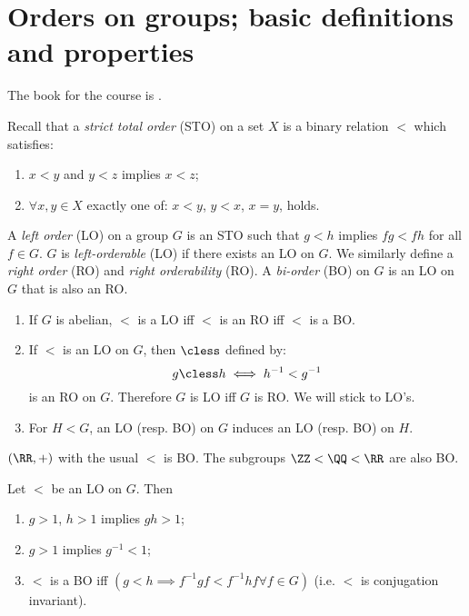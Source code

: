 \chapter{Orders on groups; basic definitions and properties}

The book for the course is \cite{book}.

Recall that a \emph{strict total order} (STO) on a set $X$ is a binary relation $<$
which satisfies:
\begin{enumerate}
\item $x < y$ and $y < z$ implies $x< z$;
\item $\forall x , y\in X$ exactly one of:
$x < y$, $y  <x$, $x = y$, holds.
\end{enumerate}

A \emph{left order} (LO) on a group $G$
is an STO such that $g < h$ implies $fg < fh$ for all $f\in G$.
$G$ is \emph{left-orderable} (LO) if there exists an LO on $G$. 
We similarly define a \emph{right order} (RO) 
and \emph{right orderability} (RO). 
A \emph{bi-order} (BO) on $G$ is an LO on $G$ that is also an RO.

\begin{rmk}
\begin{enumerate}
\item If $G$ is abelian, $<$ is a LO iff $<$ is an RO iff $<$ is a BO.
\item If $<$ is an LO on $G$, then $\cless$ defined by:
\begin{equation}
g\cless h \iff h^{-1} < g^{-1}
\end{equation}
is an RO on $G$.
Therefore $G$ is LO iff $G$ is RO.
We will stick to LO's.
\item For $H < G$, an LO (resp. BO) on $G$ induces an LO (resp. BO) on $H$.
\end{enumerate}
\end{rmk}

\begin{exm}
$\left(\RR , +\right)$ with the usual $<$ is BO. The subgroups $\ZZ < \QQ < \RR$ are also
BO.
\end{exm}

\begin{lem}
Let $<$ be an LO on $G$. Then
\begin{enumerate}
\item $g > 1$, $h > 1$ implies $gh > 1$;
\item $g > 1$ implies $g^{-1} < 1$;
\item $<$ is a BO iff 
$
\left(g < h \implies f^{-1} gf < f^{-1} h f \forall f\in G\right)
$ (i.e. $<$ is conjugation invariant).
\end{enumerate}
\label{lem:1.1}
\end{lem}

